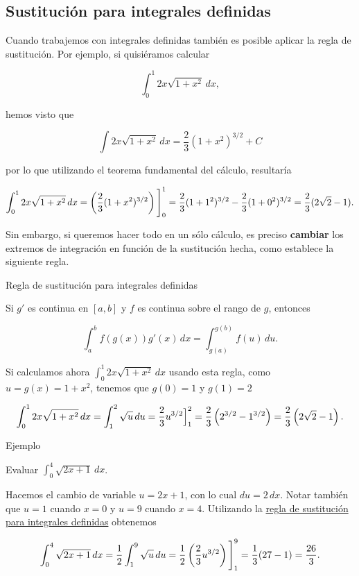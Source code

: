 \documentclass[
  letterpaper,
]{book}
\theoremstyle{plain}
\theoremstyle{remark}
\begin{document}
\subsection{Sustitución para integrales
definidas}\label{sustituciuxf3n-para-integrales-definidas}

Cuando trabajemos con integrales definidas también es posible aplicar la
regla de sustitución. Por ejemplo, si quisiéramos calcular

\[
\int_0^1 2x\sqrt{1+x^2}\,dx,
\]

hemos visto que

\[
\int 2x\sqrt{1+x^2}\,dx=\frac{2}{3}(1+x^2)^{3/2}+C
\]

por lo que utilizando el teorema fundamental del cálculo, resultaría

\[
\int_0^1 2x\sqrt{1+x^2}\,dx=\left(\frac{2}{3}(1+x^2)^{3/2}\right)\Bigg{]}_{0}^1=\frac{2}{3}(1+1^2)^{3/2}-\frac{2}{3}(1+0^2)^{3/2}=\frac{2}{3}(2\sqrt{2}-1).
\]

Sin embargo, si queremos hacer todo en un sólo cálculo, es preciso
\textbf{cambiar} los extremos de integración en función de la
sustitución hecha, como establece la siguiente regla.

\label{teo-sustitucion-definida}
Regla de sustitución para integrales definidas

Si \(g'\) es continua en \([a,b]\) y \(f\) es continua sobre el rango de
\(g\), entonces

\[
\int_a^b f(g(x))g'(x)\,dx=\int_{g(a)}^{g(b)} f(u)\,du.
\]

Si calculamos ahora \(\displaystyle \int_0^1 2x\sqrt{1+x^2}\,dx\) usando
esta regla, como \(u=g(x)=1+x^2\), tenemos que \(g(0)=1\) y \(g(1)=2\)

\[
\int_0^1 2x\sqrt{1+x^2}\,dx=\int_1^2 \sqrt{u}\,du =\frac{2}{3}u^{3/2}\Big{]}_1^2=\frac{2}{3}\left(2^{3/2}-1^{3/2}\right)=\frac{2}{3}\left(2\sqrt{2}-1\right).
\]

Ejemplo

Evaluar \(\displaystyle \int_0^4 \sqrt{2x+1}\,dx\).

\begin{tcolorbox}[enhanced jigsaw, opacityback=0, left=2mm, opacitybacktitle=0.6, toprule=.15mm, bottomrule=.15mm, colbacktitle=quarto-callout-tip-color!10!white, titlerule=0mm, bottomtitle=1mm, title=\textcolor{quarto-callout-tip-color}{\faLightbulb}\hspace{0.5em}{Solución}, toptitle=1mm, colframe=quarto-callout-tip-color-frame, colback=white, breakable, rightrule=.15mm, arc=.35mm, leftrule=.75mm, coltitle=black]

Hacemos el cambio de variable \(u=2x+1\), con lo cual \(du=2\,dx\).
Notar también que \(u=1\) cuando \(x=0\) y \(u=9\) cuando \(x=4\).
Utilizando la \hyperref[teo-sustitucion-definida]{regla de sustitución
para integrales definidas} obtenemos

\[
\int_0^4 \sqrt{2x+1}\,dx=\frac{1}{2}\int_1^9\sqrt{u}\,du=\frac{1}{2}\left(\frac{2}{3}u^{3/2}\right)\Bigg{]}_1^9=\frac{1}{3}(27-1)=\frac{26}{3}. 
\]

\end{tcolorbox}
\end{document}
